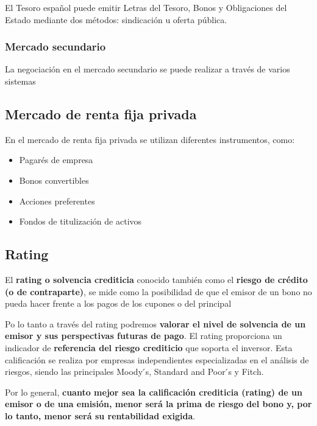 \documentclass[
  letterpaper,
  DIV=11,
  numbers=noendperiod]{scrartcl}
\providecommand{\tightlist}{%
  \setlength{\itemsep}{0pt}\setlength{\parskip}{0pt}}\usepackage{longtable,booktabs,array}
\begin{document}
El Tesoro español puede emitir Letras del Tesoro, Bonos y Obligaciones
del Estado mediante dos métodos: sindicación u oferta pública.

\hypertarget{mercado-secundario}{%
\subsubsection{Mercado secundario}\label{mercado-secundario}}

La negociación en el mercado secundario se puede realizar a través de
varios sistemas

\hypertarget{mercado-de-renta-fija-privada}{%
\subsection{Mercado de renta fija
privada}\label{mercado-de-renta-fija-privada}}

En el mercado de renta fija privada se utilizan diferentes instrumentos,
como:

\begin{itemize}
\tightlist
\item
  Pagarés de empresa
\item
  Bonos convertibles
\item
  Acciones preferentes
\item
  Fondos de titulización de activos
\end{itemize}

\hypertarget{rating}{%
\subsection{Rating}\label{rating}}

El \textbf{rating o solvencia crediticia} conocido también como el
\textbf{riesgo de crédito (o de contraparte)}, se mide como la
posibilidad de que el emisor de un bono no pueda hacer frente a los
pagos de los cupones o del principal

Po lo tanto a través del rating podremos \textbf{valorar el nivel de
solvencia de un emisor y sus perspectivas futuras de pago}. El rating
proporciona un indicador de \textbf{referencia del riesgo crediticio}
que soporta el inversor. Esta calificación se realiza por empresas
independientes especializadas en el análisis de riesgos, siendo las
principales Moody ́s, Standard and Poor ́s y Fitch.

Por lo general, \textbf{cuanto mejor sea la calificación crediticia
(rating) de un emisor o de una emisión, menor será la prima de riesgo
del bono y, por lo tanto, menor será su rentabilidad exigida}.
\end{document}
